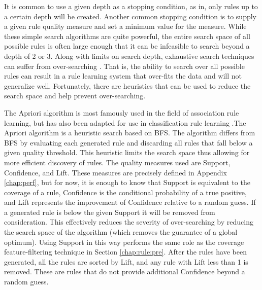It is common to use a given depth as a stopping condition, as in, only rules up to a certain depth will be created. Another common stopping condition is to supply a given rule quality measure and set a minimum value for the measure. While these simple search algorithms are quite powerful, the entire search space of all possible rules is often large enough that it can be infeasible to search beyond a depth of 2 or 3.
Along with limits on search depth, exhaustive search techniques can suffer from over-searching \cite{quinlan1995oversearching} \cite{janssen2008oversearching}. That is, the ability to search over all possible rules can result in a rule learning system that over-fits the data and will not generalize well.
 Fortunately, there are heuristics that can be used to reduce the search space and help prevent over-searching.

 The Apriori algorithm \cite{agrawal1996fast} is most famously used in the field of association rule learning, but has also been adapted for use in classification rule learning \cite{liu1998integrating} \cite{liu2000improving} \cite{jovanoski2001classification}.The Apriori algorithm is a heuristic search based on BFS. The algorithm differs from BFS by evaluating each generated rule and discarding all rules that fall below a given quality threshold. This heuristic limits the search space thus allowing for more efficient discovery of rules. The quality measures used are Support, Confidence, and Lift. These measures are precisely defined in Appendix \ref{chap:perf}, but for now, it is enough to know that Support is equivalent to the coverage of a rule, Confidence is the conditional probability of a true positive, and Lift represents the improvement of Confidence relative to a random guess. If a generated rule is below the given Support it will be removed from consideration. This effectively reduces the severity of over-searching by reducing the search space of the algorithm (which removes the guarantee of a global optimum). Using Support in this way performs the same role as the coverage feature-filtering technique in Section \ref{chap:rule:pre}. After the rules have been generated, all the rules are sorted by Lift, and any rule with Lift less than 1 is removed. These are rules that do not provide additional Confidence beyond a random guess.

